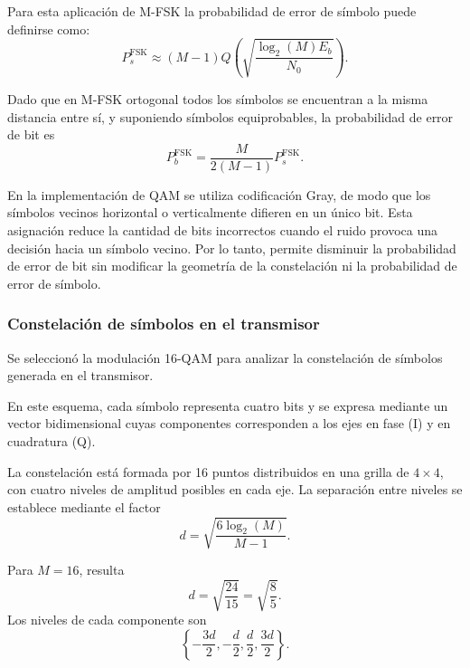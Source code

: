 Para esta aplicación de M-FSK la probabilidad de error de símbolo puede definirse como:
\begin{equation}
    P_s^{\mathrm{FSK}}
    \approx
    (M-1)
    Q\left(\sqrt{\frac{\log_2(M) E_b}{N_0}}\right).
\end{equation}

Dado que en M-FSK ortogonal todos los símbolos se
encuentran a la misma distancia entre sí, y suponiendo
símbolos equiprobables, la probabilidad de error de bit
es
\begin{equation}
    P_b^{\mathrm{FSK}} =
    \frac{M}{2(M-1)}P_s^{\mathrm{FSK}}.
\end{equation}

En la implementación de QAM se utiliza codificación
Gray, de modo que los símbolos vecinos horizontal o
verticalmente difieren en un único bit. Esta asignación
reduce la cantidad de bits incorrectos cuando el ruido
provoca una decisión hacia un símbolo vecino. Por lo
tanto, permite disminuir la probabilidad de error de bit
sin modificar la geometría de la constelación ni la
probabilidad de error de símbolo.

\subsubsection{Constelación de símbolos en el transmisor}

Se seleccionó la modulación 16-QAM para analizar la
constelación de símbolos generada en el transmisor.

En este esquema, cada símbolo representa cuatro bits
y se expresa mediante un vector bidimensional cuyas
componentes corresponden a los ejes en fase (I) y en
cuadratura (Q).

La constelación está formada por 16 puntos distribuidos
en una grilla de $4\times4$, con cuatro niveles de
amplitud posibles en cada eje. La separación entre
niveles se establece mediante el factor
\begin{equation}
    d =
    \sqrt{\frac{6\log_2(M)}{M-1}}.
\end{equation}

Para $M=16$, resulta
\begin{equation}
    d = \sqrt{\frac{24}{15}}
      = \sqrt{\frac{8}{5}}.
\end{equation}
Los niveles de cada componente son
\begin{equation}
    \left\{
        -\frac{3d}{2},
        -\frac{d}{2},
        \frac{d}{2},
        \frac{3d}{2}
    \right\}.
\end{equation}

